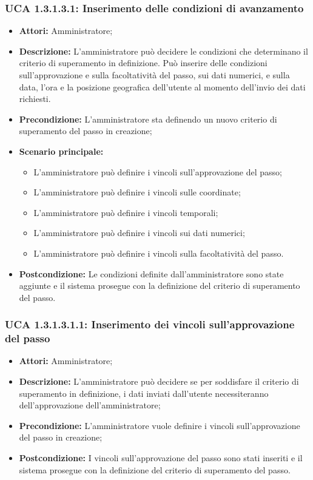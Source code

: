 \subsubsection{UCA 1.3.1.3.1: Inserimento delle condizioni di avanzamento}
\begin{itemize}
\item \textbf{Attori:}
 Amministratore;
\item \textbf{Descrizione:} 
L'amministratore può decidere le condizioni che determinano il criterio di superamento in definizione.
Può inserire delle condizioni sull'approvazione e sulla facoltatività del passo, sui dati numerici, e sulla data, l'ora e la posizione geografica dell'utente al momento dell'invio dei dati richiesti.
\item \textbf{Precondizione:} 
L'amministratore sta definendo un nuovo criterio di superamento del passo in creazione;
\item \textbf{Scenario principale:} 
\begin{itemize}
\item L'amministratore può definire i vincoli sull'approvazione del passo;
\item L'amministratore può definire i vincoli sulle coordinate;
\item L'amministratore può definire i vincoli temporali;
\item L'amministratore può definire i vincoli sui dati numerici;
\item L'amministratore può definire i vincoli sulla facoltatività del passo.
\end{itemize}
\item \textbf{Postcondizione:}
 Le condizioni definite dall'amministratore sono state aggiunte e il sistema prosegue con la definizione del criterio di superamento del passo.
\end{itemize}

\hypertarget{A1.3.1.3.1.1}{}
\subsubsection{UCA 1.3.1.3.1.1: Inserimento dei vincoli sull'approvazione del passo}
\begin{itemize}
\item \textbf{Attori:}
 Amministratore;
\item \textbf{Descrizione:} 
L'amministratore può decidere se per soddisfare il criterio di superamento in definizione, i dati inviati dall'utente necessiteranno dell'approvazione dell'amministratore;
\item \textbf{Precondizione:} 
L'amministratore vuole definire i vincoli sull'approvazione del passo in creazione;
\item \textbf{Postcondizione:} 
I vincoli sull'approvazione del passo sono stati inseriti e il sistema prosegue con la definizione del criterio di superamento del passo.
\end{itemize}

